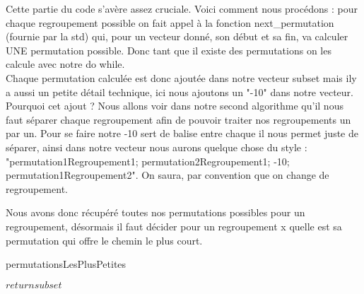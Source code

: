 \documentclass[a4paper,sffamily,12pt]{article}
\begin{document}
			Cette partie du code s'avère assez cruciale. Voici comment nous procédons : pour chaque regroupement possible on fait appel à la fonction next\_permutation (fournie par la std) qui, pour un vecteur donné, son début et sa fin, va calculer UNE permutation possible. Donc tant que il existe des permutations on les calcule avec notre do while.\\
			\indent Chaque permutation calculée est donc ajoutée dans notre vecteur subset mais ily  a aussi un petite détail technique, ici nous ajoutons un "-10" dans notre vecteur. Pourquoi cet ajout ? Nous allons voir dans notre second algorithme qu'il nous faut séparer chaque regroupement afin de pouvoir traiter nos regroupements un par un. Pour se faire notre -10 sert de balise entre chaque il nous permet juste de séparer, ainsi dans notre vecteur nous aurons quelque chose du style : "permutation1Regroupement1; permutation2Regroupement1; -10; permutation1Regroupement2". On saura, par convention que on change de regroupement. 

			\newpage
			
			 Nous avons donc récupéré toutes nos permutations possibles pour un regroupement, désormais il faut décider pour un regroupement x quelle est sa permutation qui offre le chemin le plus court.

			\IncMargin{1em}
			\begin{algorithm}
				\caption{permutationsLesPlusPetites}				
				\BlankLine
				
				$return subset$ \\
			\end{algorithm}\DecMargin{1em}
\end{document}
